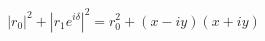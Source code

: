 \documentclass[preview]{standalone}
\begin{document}
\begin{align*}
|r_0|^2 + |r_1 e^{i\delta}|^2 = r_0^2 + (x-iy)(x+iy)
\end{align*}
\end{document}

